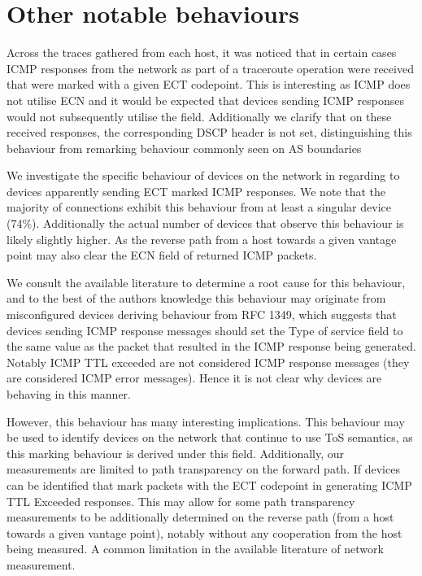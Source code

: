 \documentclass{l4proj}
\begin{document}
\section{Other notable behaviours}

Across the traces gathered from each host, it was noticed that in certain cases ICMP responses from the network as part of a traceroute operation were received that were marked with a given ECT codepoint. This is interesting as ICMP does not utilise ECN and it would be expected that devices sending ICMP responses would not subsequently utilise the field. Additionally we clarify that on these received responses, the corresponding DSCP header is not set, distinguishing this behaviour from remarking behaviour commonly seen on AS boundaries

We investigate the specific behaviour of devices on the network in regarding to devices apparently sending ECT marked ICMP responses. We note that the majority of connections exhibit this behaviour from at least a singular device (74\%). Additionally the actual number of devices that observe this behaviour is likely slightly higher. As the reverse path from a host towards a given vantage point may also clear the ECN field of returned ICMP packets.

We consult the available literature to determine a root cause for this behaviour, and to the best of the authors knowledge this behaviour may originate from misconfigured devices deriving behaviour from RFC 1349, which suggests that devices sending ICMP response messages should set the Type of service field to the same value as the packet that resulted in the ICMP response being generated. Notably ICMP TTL exceeded are not considered ICMP response messages (they are considered ICMP error messages). Hence it is not clear why devices are behaving in this manner.

However, this behaviour has many interesting implications. This behaviour may be used to identify devices on the network that continue to use ToS semantics, as this marking behaviour is derived under this field. Additionally, our measurements are limited to path transparency on the forward path. If devices can be identified that mark packets with the ECT codepoint in generating ICMP TTL Exceeded responses. This may allow for some path transparency measurements to be additionally determined on the reverse path (from a host towards a given vantage point), notably without any cooperation from the host being measured. A common limitation in the available literature of network measurement.
\end{document}
